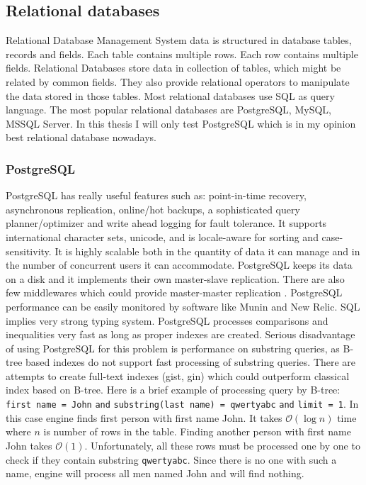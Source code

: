 \documentclass[10pt,a4paper]{article}
\newcommand{\Oh}{\mathcal{O}}
\begin{document}
\subsection{Relational databases}
Relational Database Management System data is structured in database tables, records and fields. Each table contains multiple rows. Each row contains multiple fields. Relational Databases store data in collection of tables, which might be related by common fields. They also provide relational operators to manipulate the data stored in those tables. Most relational databases use SQL as query language. The most popular relational databases are PostgreSQL, MySQL, MSSQL Server. In this thesis I will only test PostgreSQL which is in my opinion best relational database nowadays.

\subsubsection{PostgreSQL}
PostgreSQL has really useful features such as: point-in-time recovery, asynchronous replication, online/hot backups, a sophisticated query planner/optimizer and write ahead logging for fault tolerance. It supports international character sets, unicode, and is locale-aware for sorting and case-sensitivity. It is highly scalable both in the quantity of data it can manage and in the number of concurrent users it can accommodate. PostgreSQL keeps its data on a disk and it implements their own master-slave replication. There are also few middlewares which could provide master-master replication \cite{PSQLREPL}. PostgreSQL performance can be easily monitored by software like Munin and New Relic. SQL implies very strong typing system. PostgreSQL processes comparisons and inequalities very fast as long as proper indexes are created. Serious disadvantage of using PostgreSQL for this problem is performance on substring queries, as B-tree based indexes do not support fast processing of substring queries. There are attempts to create full-text indexes (gist, gin) which could outperform classical index based on B-tree.
Here is a brief example of processing query by B-tree: \verb|first name = John| \verb|and| \verb|substring(last name) = qwertyabc| \verb|and| \verb|limit = 1|. In this case engine finds first person with first name John. It takes $\Oh(\log n)$ time where $n$ is number of rows in the table. Finding another person with first name John takes $\Oh(1)$. Unfortunately, all these rows must be processed one by one to check if they contain substring \verb|qwertyabc|. Since there is no one with such a name, engine will process all men named John and will find nothing.
\end{document}
